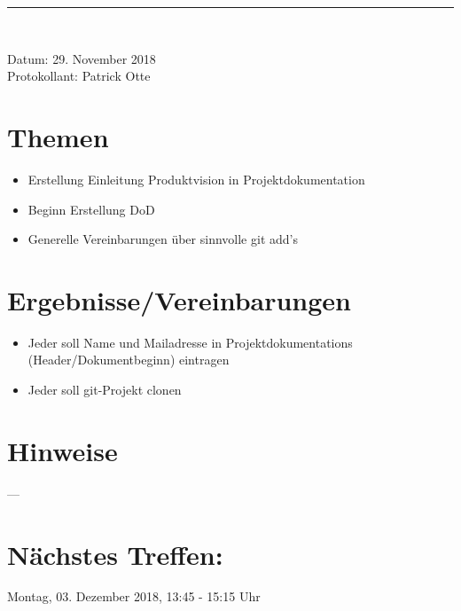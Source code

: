 \begin{center}  
\vspace{15pt}\nointerlineskip\rule{\textwidth}{0.2pt}\\ 
\vspace{0.5pt}\nointerlineskip
\end{center} 
\large Datum: 29. November 2018\vspace{3pt}\\\large Protokollant: Patrick Otte
\section*{Themen}
\begin{itemize}
\item Erstellung Einleitung Produktvision in Projektdokumentation
\item Beginn Erstellung DoD
\item Generelle Vereinbarungen über sinnvolle git add's
\end{itemize}
\section*{Ergebnisse/Vereinbarungen}
\begin{itemize}
\item Jeder soll Name und Mailadresse in Projektdokumentations (Header/Dokumentbeginn) eintragen
\item Jeder soll git-Projekt clonen
\end{itemize}
\section*{Hinweise}
---
\section*{Nächstes Treffen:}
Montag, 03. Dezember 2018, 13:45 - 15:15 Uhr